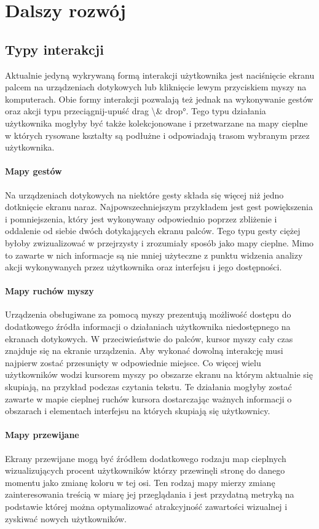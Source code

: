 \section{Dalszy rozwój}
\label{sec:future_work}

\subsection{Typy interakcji}
Aktualnie jedyną wykrywaną formą interakcji użytkownika jest naciśnięcie ekranu palcem na urządzeniach dotykowych lub kliknięcie lewym przyciskiem myszy na komputerach. Obie formy interakcji pozwalają też jednak na wykonywanie gestów oraz akcji typu przeciągnij-upuść \ang{drag \& drop}. Tego typu działania użytkownika mogłyby być także kolekcjonowane i przetwarzane na mapy cieplne w których rysowane kształty są podłużne i odpowiadają trasom wybranym przez użytkownika.

\paragraph{Mapy gestów} Na urządzeniach dotykowych na niektóre gesty składa się więcej niż jedno dotknięcie ekranu naraz. Najpowszechniejszym przykładem jest gest powiększenia i pomniejszenia, który jest wykonywany odpowiednio poprzez zbliżenie i oddalenie od siebie dwóch dotykających ekranu palców. Tego typu gesty ciężej byłoby zwizualizować w przejrzysty i zrozumiały sposób jako mapy cieplne. Mimo to zawarte w nich informacje są nie mniej użyteczne z punktu widzenia analizy akcji wykonywanych przez użytkownika oraz interfejsu i jego dostępności.

\paragraph{Mapy ruchów myszy} Urządzenia obsługiwane za pomocą myszy prezentują możliwość dostępu do dodatkowego źródła informacji o działaniach użytkownika niedostępnego na ekranach dotykowych. W przeciwieństwie do palców, kursor myszy cały czas znajduje się na ekranie urządzenia. Aby wykonać dowolną interakcję musi najpierw zostać przesunięty w odpowiednie miejsce. Co więcej wielu użytkowników wodzi kursorem myszy po obszarze ekranu na którym aktualnie się skupiają, na przykład podczas czytania tekstu. Te działania mogłyby zostać zawarte w mapie cieplnej ruchów kursora dostarczając ważnych informacji o obszarach i elementach interfejsu na których skupiają się użytkownicy.

\paragraph{Mapy przewijane} Ekrany przewijane mogą być źródłem dodatkowego rodzaju map cieplnych wizualizujących procent użytkowników którzy przewinęli stronę do danego momentu jako zmianę koloru w tej osi. Ten rodzaj mapy mierzy zmianę zainteresowania treścią w miarę jej przeglądania i jest przydatną metryką na podstawie której można optymalizować atrakcyjność zawartości wizualnej i zyskiwać nowych użytkowników.

